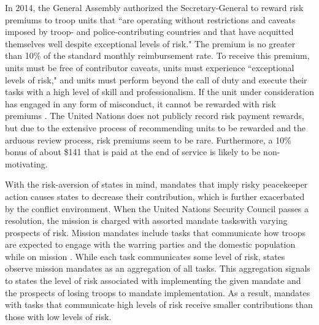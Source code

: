 \documentclass[12pt]{article}
\begin{document}


In 2014, the General Assembly authorized the Secretary-General to reward risk premiums to troop units that ``are operating without restrictions and caveats imposed by troop- and police-contributing countries and that have acquitted themselves well despite exceptional levels of risk." The premium is no greater than 10\% of the standard monthly reimbursement rate. To receive this premium, units must be free of contributor caveats, units must experience ``exceptional levels of risk," and units must perform beyond the call of duty and execute their tasks with a high level of skill and professionalism. If the unit under consideration has engaged in any form of misconduct, it cannot be rewarded with risk premiums \citep{razza_2020}. The United Nations does not publicly record risk payment rewards, but due to the extensive process of recommending units to be rewarded and the arduous review process, risk premiums seem to be rare. Furthermore, a 10\% bonus of about \$141 that is paid at the end of service is likely to be non-motivating.

With the risk-aversion of states in mind, mandates that imply risky peacekeeper action causes states to decrease their contribution, which is further exacerbated by the conflict environment. When the United Nations Security Council passes a resolution, the mission is charged with assorted mandate tasks\footnotemark[8] with varying prospects of risk. Mission mandates include tasks that communicate how troops are expected to engage with the warring parties and the domestic population while on mission \citep{di2022introducing}. While each task communicates some level of risk, states observe mission mandates as an aggregation of all tasks. This aggregation signals to states the level of risk associated with implementing the given mandate and the prospects of losing troops to mandate implementation. As a result, mandates with tasks that communicate high levels of risk receive smaller contributions than those with low levels of risk. 
\end{document}
